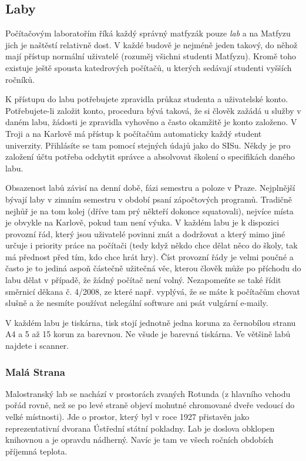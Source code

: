\subsection{Laby}
Počítačovým laboratořím říká každý správný matfyzák pouze \textit{lab} a na
Matfyzu jich je naštěstí relativně dost. V každé budově je nejméně jeden takový,
do něhož mají přístup normální uživatelé (rozuměj všichni studenti Matfyzu).
Kromě toho existuje ještě spousta katedrových počítačů, u kterých sedávají
studenti vyšších ročníků.

K přístupu do labu potřebujete zpravidla průkaz studenta a uživatelské konto.
Potřebujete-li založit konto, procedura bývá taková, že si člověk zažádá u
služby v daném labu, žádosti je zpravidla vyhověno a často okamžitě je konto
založeno. V Troji a na Karlově má přístup k počítačům automaticky každý student
univerzity. Přihlásíte se tam pomocí stejných údajů jako do SISu. Někdy je pro
založení účtu potřeba odchytit správce a absolvovat školení o specifikách daného
labu.

Obsazenost labů závisí na denní době, fázi semestru a poloze v Praze. Nejplnější
bývají laby v zimním semestru v období psaní zápočtových programů. Tradičně
nejhůř je na tom kolej (dříve tam prý někteří dokonce squatovali), nejvíce místa
je obvykle na Karlově, pokud tam není výuka. V každém labu je k dispozici
provozní řád, který jsou uživatelé povinni znát a dodržovat a který mimo jiné
určuje i priority práce na počítači (tedy když někdo chce dělat něco do školy,
tak má přednost před tím, kdo chce hrát hry). Číst provozní řády je velmi poučné
a často je to jediná aspoň částečně užitečná věc, kterou člověk může po příchodu
do labu dělat v případě, že žádný počítač není volný. Nezapomeňte se také řídit
směrnicí děkana č. 4/2008, ze které např. vyplývá, že se máte k počítačům chovat
slušně a že nesmíte používat nelegální software ani psát vulgární e-maily.

V každém labu je tiskárna, tisk stojí jednotně jedna koruna za černobílou stranu
A4 a 5 až 15 korun za barevnou. Ne všude je barevná tiskárna. Ve většině labů
najdete i scanner.


\subsubsection{Malá Strana}
Malostranský lab se nachází v prostorách zvaných Rotunda (z hlavního vchodu
pořád rovně, než se po levé straně objeví mohutné chromované dveře vedoucí do
velké místnosti). Jde o prostor, který byl v roce 1927 přistavěn jako
reprezentativní dvorana Ústřední státní pokladny. Lab je doslova obklopen
knihovnou a je opravdu nádherný. Navíc je tam ve všech ročních obdobích příjemná
teplota.

